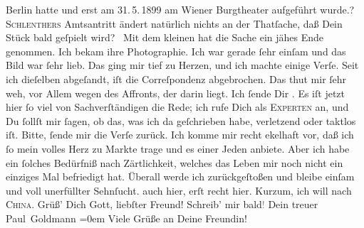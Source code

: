\begin{ledgroupsized}[t]{13cm}
{{{                     Berlin hatte und erst am 31. 5. 1899 am Wiener Burgtheater aufgeführt wurde.}}}\label{K_L02836-4h}? \textsc{Schlenthers}{ }Amtsantritt ändert natürlich
               nichts an der Thatſache, daß Dein Stück bald geſpielt wird? {\dotsfive}\pend
           \pstart
           {\pb}Mit dem kleinen \label{K_L02836-5v}\label{K_L02836-5h} hat die Sache ein jähes Ende genommen. Ich bekam ihre Photographie. Ich war
               gerade ſehr einſam und das Bild war ſehr lieb. Das ging mir tief zu Herzen, und ich
               machte einige Verſe. Seit ich dieſelben abgeſandt, iſt die Correſpondenz abgebrochen.
               Das thut mir ſehr weh, \strikeout{\textcolor{gray}{v}} vor Allem wegen des Affronts, der darin liegt. Ich ſende Dir \label{K_L02836-6v}\label{K_L02836-6h}. Es iſt jetzt hier ſo viel von
               Sachverſtändigen die Rede; ich rufe Dich als \textsc{Experten} an,
               und Du ſollſt mir ſagen, ob das, was ich da geſchrieben habe, verletzend oder taktlos
               iſt. Bitte, ſende mir die Verſe zurück. Ich komme mir recht ekelhaft vor, daß ich ſo
               mein volles Herz zu Markte trage und es einer Jeden anbiete. Aber ich habe ein
               ſolches {\pb}Bedürfniß nach Zärtlichkeit, welches das
               Leben mir noch nicht ein einziges Mal befriedigt hat. Überall werde ich
               zurückgeſtoßen und bleibe einſam und voll unerfüllter Sehnſucht. \label{K_L02836-7v}\label{K_L02836-7h} auch hier,
               erſt recht hier. Kurzum, ich will nach \textsc{China}.\pend
           \pstart
           Grüß’ Dich Gott, liebſter Freund! Schreib’ mir bald\textcolor{gray}{!}\pend
           \pstart
           Dein treuer {\\[\baselineskip]}\spacefill\mbox{Paul Goldmann}\pend
           \leftskip=0em{}\pstart
           \noindent{}Viele Grüße an Deine Freundin!\pend
           

\end{ledgroupsized}
